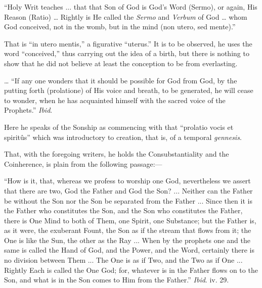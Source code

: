``Holy Writ teaches ... that that Son of God is God's Word (Sermo),
or again, His Reason (Ratio) … Rightly is He called the \emph{Sermo}
and \emph{Verbum} of God … whom God conceived, not in the
womb, but in the mind (non utero, sed mente).''

That is ``in utero mentis,'' a figurative
``uterus.'' It is to be observed, he uses the word
``conceived,'' thus carrying out the idea of a birth, but
there is nothing to show that he did not believe at least the
conception to be from everlasting.

… ``If any one wonders that it should be possible for God
from God, by the putting forth (prolatione) of His voice and breath,
to be generated, he will cease to wonder, when he has acquainted
himself with the sacred voice of the Prophets.'' \emph{Ibid}.

Here he speaks of the Sonship as commencing with that ``prolatio
vocis et spiritûs'' which was introductory to creation, that is,
of a temporal \emph{gennesis}.

That, with the foregoing writers, he holds the Consubstantiality
and the Coinherence, is plain from the following passage:—

``How is it, that, whereas we profess to worship one God,
nevertheless we assert that there are two, God the Father and God the
Son? ... Neither can the Father be without the Son nor the Son be
separated from the Father ... Since then it is the Father who
constitutes the Son, and the Son who constitutes the Father, there is
One Mind to both of Them, one Spirit, one Substance; but the Father
is, as it were, the exuberant Fount, the Son as if the stream that
flows from it; the One is like the Sun, the other as the Ray ... When
by the prophets one and the same is called the Hand of God, and the
Power, and the Word, certainly there is no division between Them ...
The One is as if Two, and the Two as if One ... Rightly Each is
called the One God; for, whatever is in the Father flows on to the
Son, and what is in the Son comes to Him from the Father.'' \emph{Ibid}.
iv. 29.

